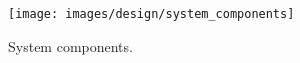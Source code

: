 
\begin{figure}[H]
	\centering
    \texttt{[image: images/design/system\_components]}
    \caption{System components.}
    \label{fig:system_components}
\end{figure}
